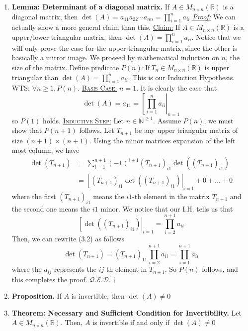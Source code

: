 \documentclass[oneside, 12pt]{book}
\newcommand{\settag}[1]{\renewcommand{\theenumi}{#1}}
\newcommand{\R}{\mathbb{R}}
\newcommand{\double}[1]{\mathbb{#1}} %
\newcommand{\qed}{\hfill $\mathcal{Q}.\mathcal{E}.\mathcal{D}.\dagger$}
\newcommand{\tbf}[1]{\textbf{#1}}
\newcommand{\tit}[1]{\textit{#1}}
\newcommand{\proof}{\tit{\underline{Proof:}}} %
\newcommand{\basecase}{\textsc{\underline{Basis Case:}} }
\newcommand{\inductive}{\textsc{\underline{Inductive Step:}} }
\newcommand{\para}[1]{\item \tbf{#1}}
\begin{document}
\begin{enumerate}
    \settag{3.2.12}
    \para{Lemma: Determinant of a diagonal matrix.} If $A \in M_{n\times n}(\R)$ is a diagonal matrix, then $\det(A) = a_{11}a_{22}\cdots a_{nn} = \prod^n_{i = 1}a_{ii}$ \newline
    \proof \newline
    We can actually show a more general claim than this. \newline
    \underline{Claim:} If $A \in M_{n\times n}(\R)$ is a upper/lower triangular matrix, then $\det(A) = \prod^n_{i = 1}a_{ii}$. Notice that we will only prove the case for the upper triangular matrix, since the other is basically a mirror image. \newline
    We proceed by mathematical induction on $n$, the size of the matrix.
    Define predicate $P(n):\text{If}~T_{n} \in M_{n\times n}(\R)$ is upper triangular than $\det(A) = \prod^n_{i = 1}a_{ii}$. This is our Induction Hypothesis. \newline
    WTS: $\forall n \geq 1, P(n).$\newline
    \basecase $n = 1$. It is clearly the case that 
    \begin{equation*}
        \det(A) = a_{11} = \left[\prod^n_{i = 1}a_{ii}\right|_{n = 1}
    \end{equation*}
    so $P(1)$ holds.\newline
    \inductive Let $n \in \double{N}^{\geq 1}$. Assume $P(n)$, we must show that $P(n + 1)$ follows. Let $T_{n+1}$ be any upper triangular matrix of size $(n+1)\times (n + 1)$. Using the minor matrices expansion of the left most column, we have
    \begin{align}
        \det \left({T_{n + 1}}\right) &= \sum_{i=1}^{n+1}(-1)^{i+1}\left(T_{n+1}\right)_{i1}\det\left(\left(T_{n+1}\right)_{i1}\right) \\
        &= \left[\left(T_{n+1}\right)_{i1}\det\left(\left(T_{n+1}\right)_{i1}\right)\right|_{i = 1} + 0 +\ldots +0
    \end{align}
    where the first $\left(T_{n+1}\right)_{i1}$ means the $i1$-th element in the matrix $T_{n+1}$ and the second one means the $i1$ minor. We notice that our I.H. tells us that
    \begin{equation*}
        \left[\det\left(\left(T_{n+1}\right)_{i1}\right)\right|_{i=1} = \prod_{i = 2}^{n+1}a_{ii}
    \end{equation*}
    Then, we can rewrite (3.2) as follows
    \begin{equation*}
        \det(T_{n+1}) = (T_{n+1})_{11}\prod_{i = 2}^{n+1}a_{ii} = \prod_{i = 1}^{n+1}a_{ii}
    \end{equation*}
    where the $a_{ij}$ represents the $ij$-th element in $T_{n+1}$. So $P(n)$ follows, and this completes the proof. \qed
    \settag{3.2.13}
    \para{Proposition.} If $A$ is invertible, then $\det(A)\neq 0$
    
    \settag{3.2.14}
    \para{Theorem: Necessary and Sufficient Condition for Invertibility.} Let $A \in M_{n\times n}(\R)$. Then, $A$ is invertible if and only if $\det(A) \neq 0$
\end{enumerate}
\end{document}
